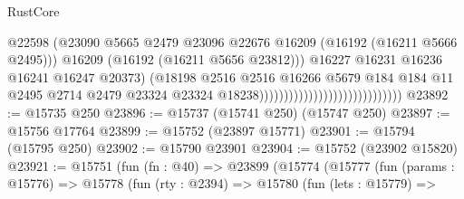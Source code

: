 \begin{lexlean}{RustCore}
\begin{coremodule}
                                                                @22598
                                                                (@23090
                                                                  @5665
                                                                  @2479
                                                                  @23096
                                                                  @22676
                                                                  @16209
                                                                  (@16192 (@16211 @5666 @2495)))
                                                                @16209
                                                                (@16192 (@16211 @5656 @23812)))
                                                              @16227
                                                              @16231
                                                              @16236
                                                              @16241
                                                              @16247
                                                              @20373)
                                                            (@18198
                                                              @2516
                                                              @2516
                                                              @16266
                                                              @5679
                                                              @184
                                                              @184
                                                              @11
                                                              @2495
                                                              @2714
                                                              @2479
                                                              @23324
                                                              @23324
                                                              @18238)))))))))))))))))))))))))))))
@23892 := @15735 @250
@23896 := @15737 (@15741 @250) (@15747 @250)
@23897 := @15756 @17764
@23899 := @15752 (@23897 @15771)
@23901 := @15794 (@15795 @250)
@23902 := @15790 @23901
@23904 := @15752 (@23902 @15820)
@23921 := @15751
    (fun (fn : @40) =>
    @23899
      (@15774
        (@15777
          (fun (params : @15776) =>
          @15778
            (fun (rty : @2394) =>
            @15780
              (fun (lets : @15779) =>

\end{coremodule}
\end{lexlean}
